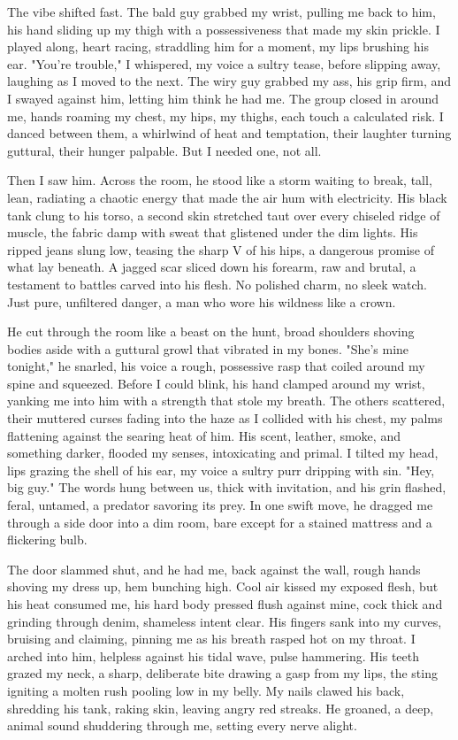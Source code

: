 \documentclass{article}
\begin{document}
The vibe shifted fast. The bald guy grabbed my wrist, pulling me back to him, his hand sliding up my thigh with a possessiveness that made my skin prickle. I played along, heart racing, straddling him for a moment, my lips brushing his ear. "You're trouble," I whispered, my voice a sultry tease, before slipping away, laughing as I moved to the next. The wiry guy grabbed my ass, his grip firm, and I swayed against him, letting him think he had me. The group closed in around me, hands roaming my chest, my hips, my thighs, each touch a calculated risk. I danced between them, a whirlwind of heat and temptation, their laughter turning guttural, their hunger palpable. But I needed one, not all.

Then I saw him. Across the room, he stood like a storm waiting to break, tall, lean, radiating a chaotic energy that made the air hum with electricity. His black tank clung to his torso, a second skin stretched taut over every chiseled ridge of muscle, the fabric damp with sweat that glistened under the dim lights. His ripped jeans slung low, teasing the sharp V of his hips, a dangerous promise of what lay beneath. A jagged scar sliced down his forearm, raw and brutal, a testament to battles carved into his flesh. No polished charm, no sleek watch. Just pure, unfiltered danger, a man who wore his wildness like a crown.

He cut through the room like a beast on the hunt, broad shoulders shoving bodies aside with a guttural growl that vibrated in my bones. "She's mine tonight," he snarled, his voice a rough, possessive rasp that coiled around my spine and squeezed. Before I could blink, his hand clamped around my wrist, yanking me into him with a strength that stole my breath. The others scattered, their muttered curses fading into the haze as I collided with his chest, my palms flattening against the searing heat of him. His scent, leather, smoke, and something darker, flooded my senses, intoxicating and primal. I tilted my head, lips grazing the shell of his ear, my voice a sultry purr dripping with sin. "Hey, big guy." The words hung between us, thick with invitation, and his grin flashed, feral, untamed, a predator savoring its prey. In one swift move, he dragged me through a side door into a dim room, bare except for a stained mattress and a flickering bulb.

The door slammed shut, and he had me, back against the wall, rough hands shoving my dress up, hem bunching high. Cool air kissed my exposed flesh, but his heat consumed me, his hard body pressed flush against mine, cock thick and grinding through denim, shameless intent clear. His fingers sank into my curves, bruising and claiming, pinning me as his breath rasped hot on my throat. I arched into him, helpless against his tidal wave, pulse hammering. His teeth grazed my neck, a sharp, deliberate bite drawing a gasp from my lips, the sting igniting a molten rush pooling low in my belly. My nails clawed his back, shredding his tank, raking skin, leaving angry red streaks. He groaned, a deep, animal sound shuddering through me, setting every nerve alight.
\end{document}
